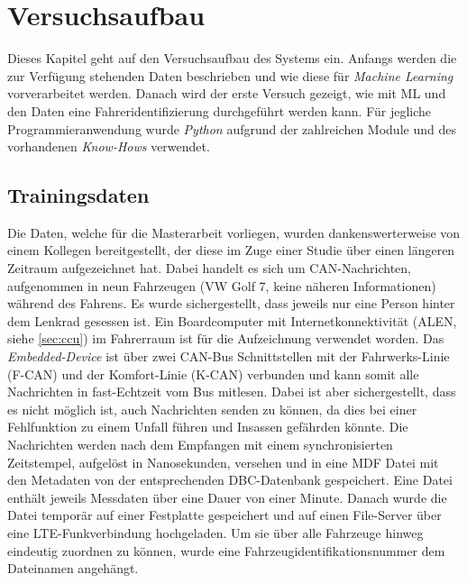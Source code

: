 %
%
%
%
%


\chapter{Versuchsaufbau}
\label{chap:set_up}

Dieses Kapitel geht auf den Versuchsaufbau des Systems ein. Anfangs werden die zur Verfügung stehenden Daten beschrieben und wie diese für \textit{Machine Learning} vorverarbeitet werden. Danach wird der erste Versuch gezeigt, wie mit ML und den Daten eine Fahreridentifizierung durchgeführt werden kann. Für jegliche Programmieranwendung wurde \textit{Python} aufgrund der zahlreichen Module und des vorhandenen \textit{Know-Hows} verwendet.

\section{Trainingsdaten}
\label{sec:data_description}

Die Daten, welche für die Masterarbeit vorliegen, wurden dankenswerterweise von einem Kollegen bereitgestellt, der diese im Zuge einer Studie über einen längeren Zeitraum aufgezeichnet hat. Dabei handelt es sich um CAN-Nachrichten, aufgenommen in neun Fahrzeugen (VW Golf 7, keine näheren Informationen) während des Fahrens. Es wurde sichergestellt, dass jeweils nur eine Person hinter dem Lenkrad gesessen ist. Ein Boardcomputer mit Internetkonnektivität (ALEN, siehe \ref{sec:ccu}) im Fahrerraum ist für die Aufzeichnung verwendet worden. Das \textit{Embedded-Device} ist über zwei CAN-Bus Schnittstellen mit der Fahrwerks-Linie (F-CAN) und der Komfort-Linie (K-CAN) verbunden und kann somit alle Nachrichten in fast-Echtzeit vom Bus mitlesen. Dabei ist aber sichergestellt, dass es nicht möglich ist, auch Nachrichten senden zu können, da dies bei einer Fehlfunktion zu einem Unfall führen und Insassen gefährden könnte. Die Nachrichten werden nach dem Empfangen mit einem synchronisierten Zeitstempel, aufgelöst in Nanosekunden, versehen und in eine MDF Datei mit den Metadaten von der entsprechenden DBC-Datenbank gespeichert. Eine Datei enthält jeweils Messdaten über eine Dauer von einer Minute. Danach wurde die Datei temporär auf einer Festplatte gespeichert und auf einen File-Server über eine LTE-Funkverbindung hochgeladen. Um sie über alle Fahrzeuge hinweg eindeutig zuordnen zu können, wurde eine Fahrzeugidentifikationsnummer dem Dateinamen angehängt.

